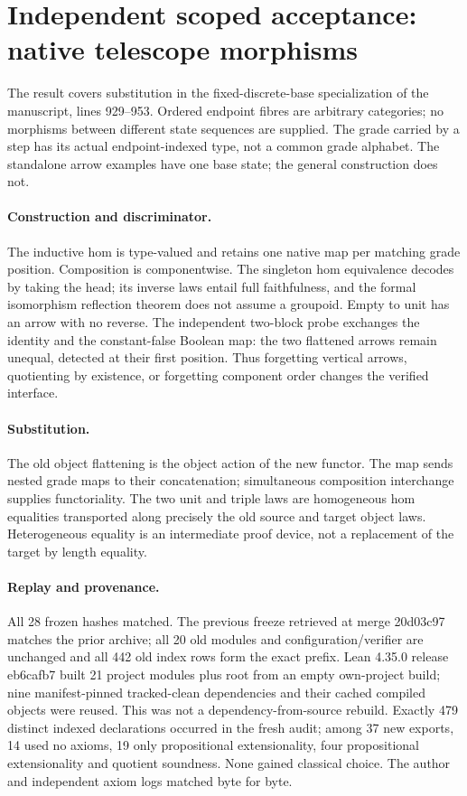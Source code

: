 \documentclass{article}
\begin{document}
\section*{Independent scoped acceptance: native telescope morphisms}
The result covers substitution in the fixed-discrete-base specialization of the manuscript, lines 929--953. Ordered endpoint fibres are arbitrary categories; no morphisms between different state sequences are supplied. The grade carried by a step has its actual endpoint-indexed type, not a common grade alphabet. The standalone arrow examples have one base state; the general construction does not.
\paragraph{Construction and discriminator.} The inductive hom is type-valued and retains one native map per matching grade position. Composition is componentwise. The singleton hom equivalence decodes by taking the head; its inverse laws entail full faithfulness, and the formal isomorphism reflection theorem does not assume a groupoid. Empty to unit has an arrow with no reverse. The independent two-block probe exchanges the identity and the constant-false Boolean map: the two flattened arrows remain unequal, detected at their first position. Thus forgetting vertical arrows, quotienting by existence, or forgetting component order changes the verified interface.
\paragraph{Substitution.} The old object flattening is the object action of the new functor. The map sends nested grade maps to their concatenation; simultaneous composition interchange supplies functoriality. The two unit and triple laws are homogeneous hom equalities transported along precisely the old source and target object laws. Heterogeneous equality is an intermediate proof device, not a replacement of the target by length equality.
\paragraph{Replay and provenance.} All 28 frozen hashes matched. The previous freeze retrieved at merge 20d03c97 matches the prior archive; all 20 old modules and configuration/verifier are unchanged and all 442 old index rows form the exact prefix. Lean 4.35.0 release eb6cafb7 built 21 project modules plus root from an empty own-project build; nine manifest-pinned tracked-clean dependencies and their cached compiled objects were reused. This was not a dependency-from-source rebuild. Exactly 479 distinct indexed declarations occurred in the fresh audit; among 37 new exports, 14 used no axioms, 19 only propositional extensionality, four propositional extensionality and quotient soundness. None gained classical choice. The author and independent axiom logs matched byte for byte.
\end{document}
